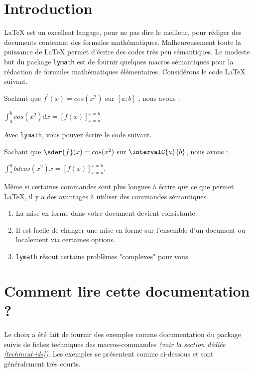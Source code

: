 \documentclass[12pt,a4paper]{article}
\newcommand\dintegrate[4]{%
  \int_{#1}^{#2} #3 d#4%
}
\newcommand\hook[4]{%
	\left[ #3 \right]_{#4=#1}^{#4=#2}%
}
\begin{document}
\section{Introduction}

\LaTeX{} est un excellent langage, pour ne pas dire le meilleur, pour rédiger des documents contenant des formules mathématiques.
Malheureusement toute la puissance de \LaTeX{} permet d'écrire des codes très peu sémantiques.
Le modeste but du package \verb+lymath+ est de fournir quelques macros sémantiques pour la rédaction de formules mathématiques élémentaires. Considérons le code \LaTeX{} suivant.

\begin{latexex-alone}
Sachant que $f^\prime(x) = cos(x^2)$ sur $[a ; b]$ , nous avons :

$\displaystyle \int_a^b cos(x^2) dx = \left[ f(x) \right]_{x=a}^{x=b}$.
\end{latexex-alone}


Avec \verb+lymath+, vous pouvez écrire le code suivant.

\begin{latexex-alone}
Sachant que $\sder{f}(x) = cos(x^2)$ sur $\intervalC{a}{b}$, nous avons :

$\dintegrate*{a}{b}{cos(x^2)}{x} = \hook{a}{b}{f(x)}{x}$.
\end{latexex-alone}


Même si certaines commandes sont plus longues à écrire que ce que permet \LaTeX{}, il y a des avantages à utiliser des commandes sémantiques.
\begin{enumerate}
	\item La mise en forme dans votre document devient consistante.

	\item Il est facile de changer une mise en forme sur l'ensemble d'un document ou localement via certaines options.

	\item \verb+lymath+ résout certains problèmes "complexes" pour vous.
\end{enumerate}




\section{Comment lire cette documentation ?}

Le choix a été fait de fournir des exemples comme documentation du package suivis de fiches techniques des macros-commandes \emph{(voir la section dédiée \ref{techincal-ids})}. Les exemples se présentent comme ci-dessous et sont généralement très courts.
\end{document}
